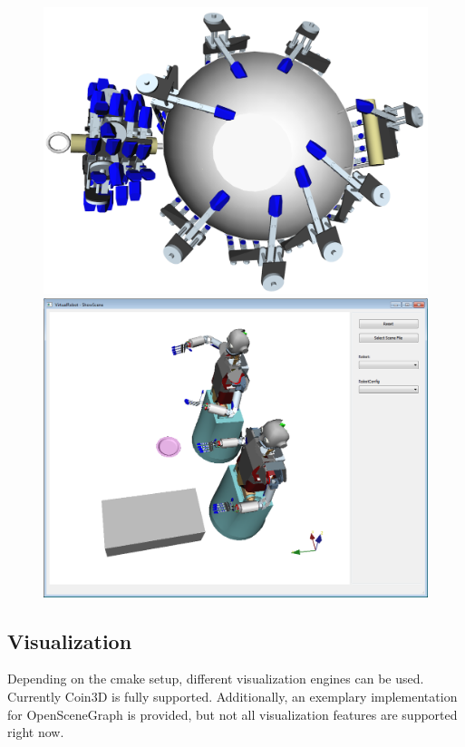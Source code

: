 \documentclass{book}
\begin{document}
\begin{figure}[H]
	\centering
	\begin{minipage} {.45\linewidth}
	  \includegraphics[width=\linewidth]{Wok_grasps_EEF}
	\end{minipage}
	\begin{minipage} {.45\linewidth}
	  \includegraphics[width=\linewidth]{Tutorial10}
	\end{minipage}	
\end{figure}
\subsection{Visualization}
Depending on the cmake setup, different visualization engines can be used. Currently Coin3D is fully supported. Additionally, an exemplary implementation for OpenSceneGraph is provided, but not all visualization features are supported right now.
\end{document}
